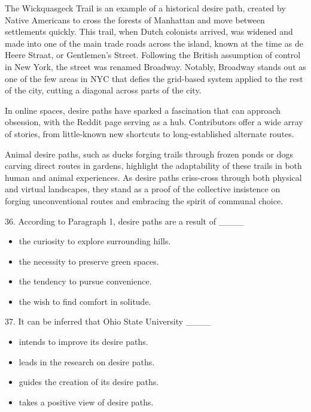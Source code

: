 \documentclass[UTF8,11pt]{ctexart}
\begin{document}
The Wickquasgeck Trail is an example of a historical desire path, created by Native Americans to cross the forests of Manhattan and move between settlements quickly. This trail, when Dutch colonists arrived, was widened and made into one of the main trade roads across the island, known at the time as de Heere Straat, or Gentlemen’s Street. Following the British assumption of control in New York, the street was renamed Broadway. Notably, Broadway stands out as one of the few areas in NYC that defies the grid-based system applied to the rest of the city, cutting a diagonal across parts of the city.


In online spaces, desire paths have sparked a fascination that can approach obsession, with the Reddit page serving as a hub. Contributors offer a wide array of stories, from little-known new shortcuts to long-established alternate routes.


Animal desire paths, such as ducks forging trails through frozen ponds or dogs carving direct routes in gardens, highlight the adaptability of these trails in both human and animal experiences. As desire paths criss-cross through both physical and virtual landscapes, they stand as a proof of the collective insistence on forging unconventional routes and embracing the spirit of communal choice.


36. According to Paragraph 1, desire paths are a result of \_\_\_\_


\begin{itemize}[leftmargin=2em,itemsep=.2em,topsep=.4em]\item[A.] the curiosity to explore surrounding hills.
\item[B.] the necessity to preserve green spaces.
\item[C.] the tendency to pursue convenience.
\item[D.] the wish to find comfort in solitude.
\end{itemize}

37. It can be inferred that Ohio State University \_\_\_\_


\begin{itemize}[leftmargin=2em,itemsep=.2em,topsep=.4em]\item[A.] intends to improve its desire paths.
\item[B.] leads in the research on desire paths.
\item[C.] guides the creation of its desire paths.
\item[D.] takes a positive view of desire paths.
\end{itemize}
\end{document}
